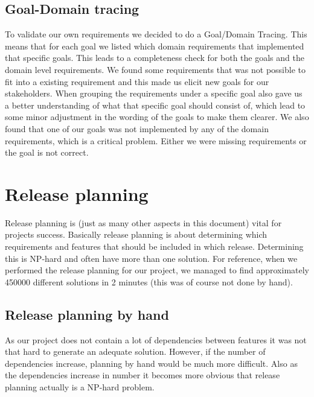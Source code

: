 \documentclass[a4paper]{article}
\begin{document}
			\subsection{Goal-Domain tracing}
				To validate our own requirements we decided to do a Goal/Domain Tracing. This means that for each goal we listed which domain requirements that implemented that specific goals. This leads to a completeness check for both the goals and the domain level requirements. We found some requirements that was not possible to fit into a existing requirement and this made us elicit new goals for our stakeholders. When grouping the requirements under a specific goal also gave us a better understanding of what that specific goal should consist of, which lead to some minor adjustment in the wording of the goals to make them clearer. We also found that one of our goals was not implemented by any of the domain requirements, which is a critical problem. Either we were missing requirements or the goal is not correct. 

	\section{Release planning}
		Release planning is (just as many other aspects in this document) vital for projects success. Basically release planning is about determining which requirements and features that should be included in which release. Determining this is NP-hard and often have more than one solution. For reference, when we performed the release planning for our project, we managed to find approximately 450000 different solutions in 2 minutes (this was of course not done by hand).

		\subsection{Release planning by hand}
		\label{sec:release_planning}
			As our project does not contain a lot of dependencies between features it was not that hard to generate an adequate solution. However, if the number of dependencies increase, planning by hand would be much more difficult. Also as the dependencies increase in number it becomes more obvious that release planning actually is a NP-hard problem.
\end{document}
